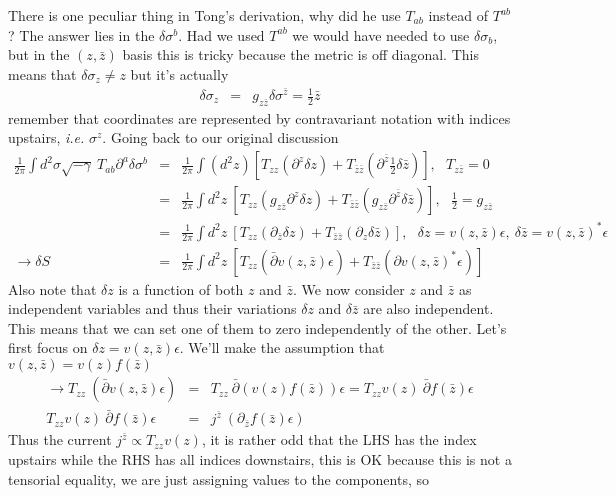 \documentclass[aps,preprint,preprintnumbers,nofootinbib,showpacs,prd]{revtex4-1}
\newcommand{\ie}{{\it i.e.} }
\newcommand{\nbea}{\begin{eqnarray*}}
\newcommand{\neea}{\end{eqnarray*}}
\begin{document}
There is one peculiar thing in Tong's derivation, why did he use $T_{ab}$ instead of $T^{ab}$? The answer lies in the $\delta\sigma^b$. Had we used $T^{ab}$ we would have needed to use $\delta\sigma_b$, but in the $(z, \bar z)$ basis this is tricky because the metric is off diagonal. This means that $\delta\sigma_z \neq z$ but it's actually 
%
\nbea
\delta\sigma_z & = & g_{z \bar z}\delta\sigma^{\bar z} = \frac {1}{2} \bar z
\neea
%
remember that coordinates are represented by contravariant notation with indices upstairs, \ie $\sigma^z$. Going back to our original discussion
%
\nbea
\frac{1}{2\pi} \int d^2 \sigma \sqrt{-\gamma}  ~ T_{ab} \partial^a \delta \sigma^b & = & \frac{1}{2\pi} \int \left ( d^2 z \right ) \left \lbrack T_{zz} ( \partial^z \delta z ) + T_{\bar z \bar z} ( \partial^{\bar z} \frac{1}{2} \delta {\bar z} ) \right \rbrack , ~~~ T_{z \bar z} = 0 \\ 
& = & \frac{1}{2\pi} \int d^2 z ~ \left \lbrack T_{zz} ( g_{z \bar z} \partial^z \delta z ) + T_{\bar z \bar z} ( g_{z \bar z} \partial^{\bar z} \delta {\bar z} ) \right \rbrack , ~~~ \frac{1}{2} = g_{z \bar z}\\ 
& = & \frac{1}{2\pi} \int d^2 z ~ \left \lbrack T_{zz} ( \partial_{\bar z} \delta z ) + T_{\bar z \bar z} ( \partial_{z} \delta {\bar z} ) \right \rbrack, ~~~ \delta z = v(z,\bar z) \epsilon,~ \delta \bar z = v(z,\bar z)^* \epsilon \\ 
\longrightarrow \delta S & = & \frac{1}{2\pi} \int d^2 z ~ \left \lbrack T_{zz} ( \bar \partial v(z,\bar z) \epsilon ) + T_{\bar z \bar z} ( \partial v(z,\bar z)^* \epsilon ) \right \rbrack
\neea
%
Also note that $\delta z$ is a function of both $z$ and $\bar z$. We now consider $z$ and $\bar z$ as independent variables and thus their variations $\delta z$ and $\delta \bar z$ are also independent. This means that we can set one of them to zero independently of the other. Let's first focus on $\delta z = v(z, \bar z) \epsilon$. We'll make the assumption that $v(z, \bar z) = v(z) f (\bar z)$
%
\nbea
\rightarrow T_{zz} ~ ( \bar \partial v(z,\bar z) \epsilon ) & = & T_{zz} ~\bar \partial ( v(z) f (\bar z) ) \epsilon = T_{zz} v(z) ~ \bar \partial f (\bar z) \epsilon \\
T_{zz} v(z) ~ \bar \partial f (\bar z) \epsilon & = & j^{\bar z} ~(\partial_{\bar z} f (\bar z) \epsilon)
\neea
%
Thus the current $j^{\bar z} \propto T_{zz} v(z)$, it is rather odd that the LHS has the index upstairs while the RHS has all indices downstairs, this is OK because this is not a tensorial equality, we are just assigning values to the components, so
\end{document}

